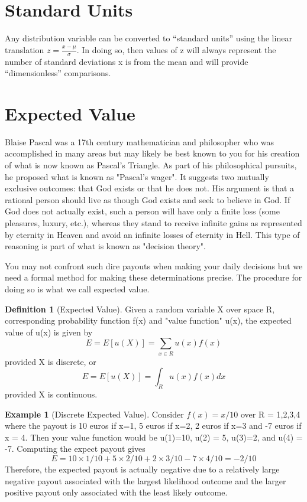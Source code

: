 \documentclass[10pt,]{book}
\theoremstyle{plain}
\theoremstyle{definition}
\newtheorem{definition}[theorem]{Definition}
\theoremstyle{definition}
\newtheorem{example}[theorem]{Example}
\numberwithin{equation}{section}
\begin{document}
\section[Standard Units]{Standard Units}\label{section-25}
Any distribution variable can be converted to “standard units” using the linear translation 
			\(\displaystyle z = \frac{x-\mu}{\sigma}\). In doing so, then values of z will always represent the number of
			standard deviations x is from the mean and will provide “dimensionless” comparisons.%
\typeout{************************************************}
\typeout{************************************************}
\section[Expected Value]{Expected Value}\label{section-26}
Blaise Pascal was a 	17th century mathematician and philosopher who was accomplished in many areas but may likely be best known to you for his creation of what is now known as Pascal's Triangle. As part of his philosophical pursuits, he proposed what is known as "Pascal's wager". It suggests two  mutually exclusive outcomes: that God exists or that he does not. His argument is that a rational person should live as though God exists and seek to believe in God. If God does not actually exist, such a person will have only a finite loss (some pleasures, luxury, etc.), whereas they stand to receive infinite gains as represented by eternity in Heaven and avoid an infinite losses of eternity in Hell. This type of reasoning is part of what is known as "decision theory".
\par
You may not confront such dire payouts when making your daily decisions but we need a formal method for making these determinations precise. The procedure for doing so is what we call expected value.
\begin{definition}[Expected Value]\label{definition-30}
Given a random variable X over space R, corresponding probability function f(x) and "value function" u(x), the expected value of u(x) is given by
	\begin{equation*}E = E[u(X)] = \sum_{x \in R} u(x) f(x)\end{equation*}
	provided X is discrete, or
	\begin{equation*}E = E[u(X)] = \int_R u(x)f(x) dx\end{equation*}
	provided X is continuous.
\end{definition}
\begin{example}[Discrete Expected Value]\label{example-21}
Consider \(f(x) = x/10\) over R = {1,2,3,4} where the payout is 10 euros if x=1, 5 euros if x=2, 2 euros if x=3 and -7 euros if x = 4.  Then your value function would be u(1)=10, u(2) = 5, u(3)=2, and u(4) = -7. Computing the expect payout gives
	\begin{equation*}E = 10 \times 1/10 + 5 \times 2/10 + 2 \times 3/10 - 7 \times 4/10 = -2/10\end{equation*}
	Therefore, the expected payout is actually negative due to a relatively large negative payout associated with the largest likelihood outcome and the larger positive payout only associated with the least likely outcome.
\end{example}
\end{document}
